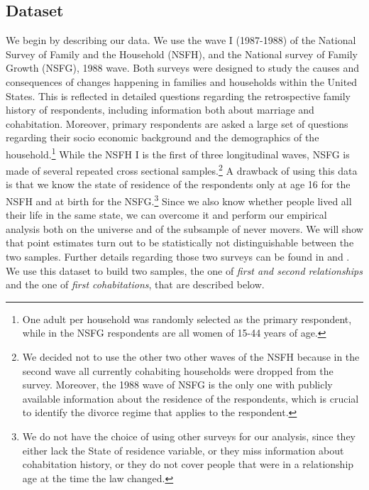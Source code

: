 \documentclass[12pt]{article}
\numberwithin{table}{section}
\begin{document}
\subsection{Dataset}\label{dataset}
We begin by describing our data. We use the wave I (1987-1988) of the National Survey of Family and the Household (NSFH), and the National survey of Family Growth (NSFG), 1988 wave. Both surveys were designed to study the causes and consequences of changes happening in families and households within the United States. This is reflected in detailed questions regarding the retrospective family history of respondents, including information both about marriage and cohabitation. Moreover, primary respondents are asked a large set of questions regarding their socio economic background and the demographics of the household.\footnote{One adult per household was randomly selected as the primary respondent, while in the NSFG respondents are all women of 15-44 years of age.} While the NSFH I is the first of three longitudinal waves, NSFG is made of several repeated cross sectional samples.\footnote{We decided not to use the other two other waves of the NSFH because in the second wave all currently cohabiting households were dropped from the survey. Moreover, the 1988 wave of NSFG is the only one with publicly available information about the residence of the respondents, which is crucial to identify the divorce regime that applies to the respondent.} A drawback of using this data is that we know the state of residence of the respondents only at age 16 for the NSFH and at birth for the NSFG.\footnote{We do not have the choice of using other surveys for our analysis, since they either lack the State of residence variable, or they miss information about cohabitation history, or they do not cover people that were in a relationship age at the time the law changed.} Since we also know whether people lived all their life in the same state, we can overcome it and perform our empirical analysis both on the universe and of the subsample of never movers. We will show that point estimates turn out to be statistically not distinguishable between the two samples. Further details regarding those two surveys can be found in \cite{bumpass2017} and \cite{mosher1996}. We use this dataset to build two samples, the one of \textit{first and second relationships} and the one of \textit{first cohabitations}, that are described below.
  
\end{document}
